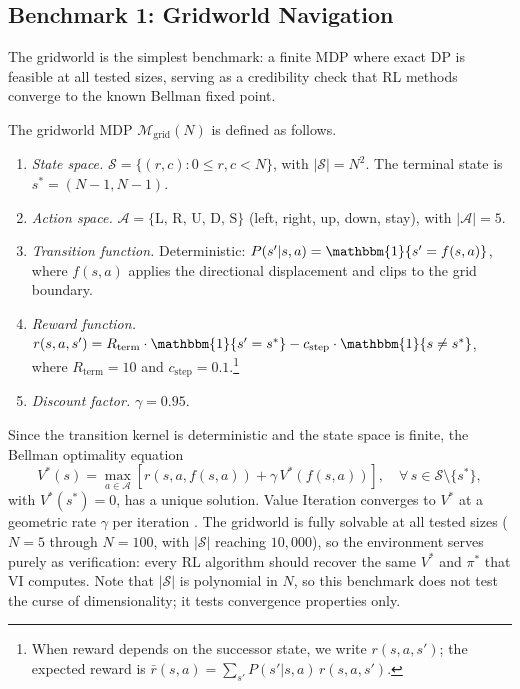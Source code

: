 \subsection{Benchmark 1: Gridworld Navigation}
\label{sec:benchmark_gridworld}

The gridworld is the simplest benchmark: a finite MDP where exact DP is feasible at all tested sizes, serving as a credibility check that RL methods converge to the known Bellman fixed point.

\begin{definition}
\label{def:gridworld_mdp}
The gridworld MDP $\mathcal{M}_{\mathrm{grid}}(N)$ is defined as follows.
\begin{enumerate}
    \item \emph{State space.} $\mathcal{S} = \{(r, c) : 0 \leq r, c < N\}$, with $|\mathcal{S}| = N^2$. The terminal state is $s^* = (N-1, N-1)$.
    \item \emph{Action space.} $\mathcal{A} = \{\text{L, R, U, D, S}\}$ (left, right, up, down, stay), with $|\mathcal{A}| = 5$.
    \item \emph{Transition function.} Deterministic: $P(s' | s, a) = \mathbbm{1}\{s' = f(s, a)\}$, where $f(s, a)$ applies the directional displacement and clips to the grid boundary.
    \item \emph{Reward function.} $r(s, a, s') = R_{\mathrm{term}} \cdot \mathbbm{1}\{s' = s^*\} - c_{\mathrm{step}} \cdot \mathbbm{1}\{s \neq s^*\}$, where $R_{\mathrm{term}} = 10$ and $c_{\mathrm{step}} = 0.1$.\footnote{When reward depends on the successor state, we write $r(s,a,s')$; the expected reward is $\bar{r}(s,a) = \sum_{s'} P(s'|s,a)\, r(s,a,s')$.}
    \item \emph{Discount factor.} $\gamma = 0.95$.
\end{enumerate}
\end{definition}

Since the transition kernel is deterministic and the state space is finite, the Bellman optimality equation
\begin{equation}
\label{eq:gridworld_bellman}
V^*(s) = \max_{a \in \mathcal{A}} \left[ r(s, a, f(s,a)) + \gamma \, V^*(f(s,a)) \right], \quad \forall\, s \in \mathcal{S} \setminus \{s^*\},
\end{equation}
with $V^*(s^*) = 0$, has a unique solution. Value Iteration converges to $V^*$ at a geometric rate $\gamma$ per iteration \citep{bertsekas1996}. The gridworld is fully solvable at all tested sizes ($N = 5$ through $N = 100$, with $|\mathcal{S}|$ reaching $10{,}000$), so the environment serves purely as verification: every RL algorithm should recover the same $V^*$ and $\pi^*$ that VI computes. Note that $|\mathcal{S}|$ is polynomial in $N$, so this benchmark does not test the curse of dimensionality; it tests convergence properties only.

